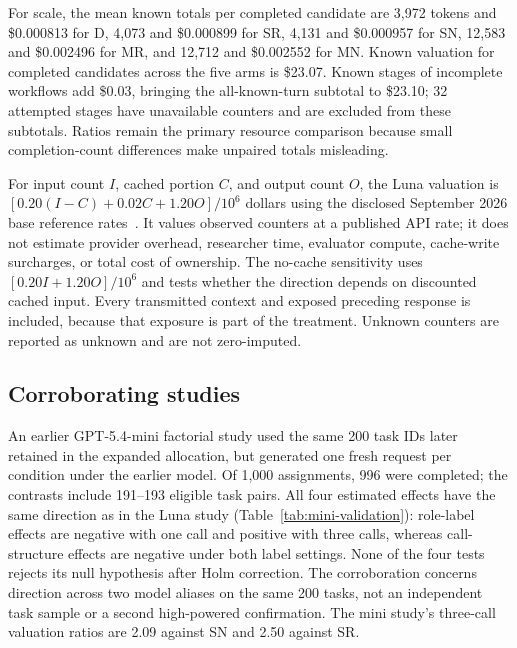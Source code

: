 For scale, the mean known totals per completed candidate are 3,972 tokens and \$0.000813 for D, 4,073 and \$0.000899 for SR, 4,131 and \$0.000957 for SN, 12,583 and \$0.002496 for MR, and 12,712 and \$0.002552 for MN. Known valuation for completed candidates across the five arms is \$23.07. Known stages of incomplete workflows add \$0.03, bringing the all-known-turn subtotal to \$23.10; 32 attempted stages have unavailable counters and are excluded from these subtotals. Ratios remain the primary resource comparison because small completion-count differences make unpaired totals misleading.

For input count $I$, cached portion $C$, and output count $O$, the Luna valuation is $[0.20(I-C)+0.02C+1.20O]/10^6$ dollars using the disclosed September 2026 base reference rates~\cite{openai56luna2026,openaipricing2026}. It values observed counters at a published API rate; it does not estimate provider overhead, researcher time, evaluator compute, cache-write surcharges, or total cost of ownership. The no-cache sensitivity uses $[0.20I+1.20O]/10^6$ and tests whether the direction depends on discounted cached input. Every transmitted context and exposed preceding response is included, because that exposure is part of the treatment. Unknown counters are reported as unknown and are not zero-imputed.




\subsection{Corroborating studies}
An earlier GPT-5.4-mini factorial study used the same 200 task IDs later retained in the expanded allocation, but generated one fresh request per condition under the earlier model. Of 1,000 assignments, 996 were completed; the contrasts include 191--193 eligible task pairs. All four estimated effects have the same direction as in the Luna study (Table~\ref{tab:mini-validation}): role-label effects are negative with one call and positive with three calls, whereas call-structure effects are negative under both label settings. None of the four tests rejects its null hypothesis after Holm correction. The corroboration concerns direction across two model aliases on the same 200 tasks, not an independent task sample or a second high-powered confirmation. The mini study's three-call valuation ratios are 2.09 against SN and 2.50 against SR.



